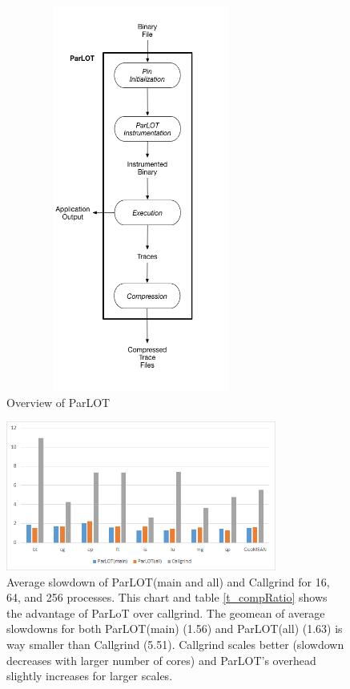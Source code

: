     
    
    
    \begin{figure}[!t]
\centering
\includegraphics[width=3.5in,height=5in]{figs.chpc/overview.png}
\caption{Overview of ParLOT}
\label{overview}
\end{figure}


\begin{figure}[!t]
\centering
\includegraphics[width=3.5in]{figs.stampede/sd_pin_cg.png}
\caption{Average slowdown of ParLOT(main and all) and Callgrind for 16, 64, and 256 processes. This chart and table \ref{t_compRatio} shows the advantage of ParLoT over callgrind. The geomean of average slowdowns for both ParLOT(main) (1.56) and ParLOT(all) (1.63) is way smaller than Callgrind (5.51). Callgrind scales better (slowdown decreases with larger number of cores) and ParLOT's overhead slightly increases for larger scales.}
\label{sd_pin_cg}
\end{figure}

